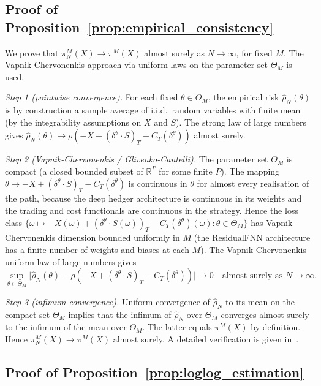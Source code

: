 \documentclass[12pt,a4paper]{article}
\theoremstyle{definition}
\theoremstyle{plain}
\theoremstyle{remark}
\theoremstyle{plain}
\begin{document}
\subsection{Proof of Proposition~\ref{prop:empirical_consistency}}
\label{proof:empirical_consistency}

We prove that $\pi^M_N(X) \to \pi^M(X)$ almost surely as $N \to
\infty$, for fixed $M$. The Vapnik-Chervonenkis approach via uniform
laws on the parameter set $\Theta_M$ is used.

\textit{Step 1 (pointwise convergence).} For each fixed
$\theta \in \Theta_M$, the empirical risk
$\widehat{\rho}_N(\theta)$ is by construction a sample average of
i.i.d.\ random variables with finite mean (by the integrability
assumptions on $X$ and $S$). The strong law of large numbers
gives
$\widehat{\rho}_N(\theta) \to \rho(-X + (\delta^\theta \cdot S)_T -
C_T(\delta^\theta))$ almost surely.

\textit{Step 2 (Vapnik-Chervonenkis / Glivenko-Cantelli).} The
parameter set $\Theta_M$ is compact (a closed bounded subset of
$\mathbb{R}^P$ for some finite $P$). The mapping
$\theta \mapsto -X + (\delta^\theta \cdot S)_T - C_T(\delta^\theta)$
is continuous in $\theta$ for almost every realisation of the path,
because the deep hedger architecture is continuous in its weights and
the trading and cost functionals are continuous in the strategy.
Hence the loss class
$\{ \omega \mapsto -X(\omega) + (\delta^\theta \cdot S(\omega))_T -
C_T(\delta^\theta)(\omega) : \theta \in \Theta_M \}$
has Vapnik-Chervonenkis dimension bounded uniformly in $M$ (the
ResidualFNN architecture has a finite number of weights and biases at
each $M$). The Vapnik-Chervonenkis uniform law of large numbers gives
\[
\sup_{\theta \in \Theta_M}
\bigl|\widehat{\rho}_N(\theta) -
\rho(-X + (\delta^\theta \cdot S)_T - C_T(\delta^\theta))\bigr|
\to 0
\quad \text{almost surely as } N \to \infty.
\]

\textit{Step 3 (infimum convergence).} Uniform convergence of
$\widehat{\rho}_N$ to its mean on the compact set $\Theta_M$ implies
that the infimum of $\widehat{\rho}_N$ over $\Theta_M$ converges almost
surely to the infimum of the mean over $\Theta_M$. The latter equals
$\pi^M(X)$ by definition. Hence $\pi^M_N(X) \to \pi^M(X)$ almost
surely. A detailed verification is given
in~\cite{Buehler2019DeepHedging}.

\subsection{Proof of Proposition~\ref{prop:loglog_estimation}}
\label{proof:loglog_slope}
\end{document}
